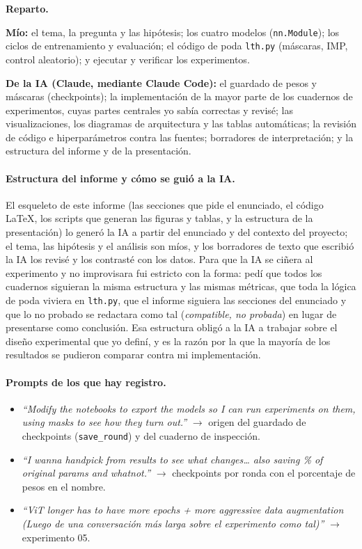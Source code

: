 \documentclass[11pt]{article}
\begin{document}
\textbf{Reparto.}

\textbf{Mío:} el tema, la pregunta y las hipótesis; los cuatro modelos (\texttt{nn.Module}); los ciclos de entrenamiento y evaluación; el código de poda \texttt{lth.py} (máscaras, IMP, control aleatorio); y ejecutar y verificar los experimentos. 

\textbf{De la IA (Claude, mediante Claude Code):} el guardado de pesos y máscaras (checkpoints); la implementación de la mayor parte de los cuadernos de experimentos, cuyas partes centrales yo sabía correctas y revisé; las visualizaciones, los diagramas de arquitectura y las tablas automáticas; la revisión de código e hiperparámetros contra las fuentes; borradores de interpretación; y la estructura del informe y de la presentación.

\paragraph{Estructura del informe y cómo se guió a la IA.} El esqueleto de este informe (las secciones que pide el enunciado, el código \LaTeX, los scripts que generan las figuras y tablas, y la estructura de la presentación) lo generó la IA a partir del enunciado y del contexto del proyecto; el tema, las hipótesis y el análisis son míos, y los borradores de texto que escribió la IA los revisé y los contrasté con los datos. Para que la IA se ciñera al experimento y no improvisara fui estricto con la forma: pedí que todos los cuadernos siguieran la misma estructura y las mismas métricas, que toda la lógica de poda viviera en \texttt{lth.py}, que el informe siguiera las secciones del enunciado y que lo no probado se redactara como tal (\textit{compatible, no probada}) en lugar de presentarse como conclusión. Esa estructura obligó a la IA a trabajar sobre el diseño experimental que yo definí, y es la razón por la que la mayoría de los resultados se pudieron comparar contra mi implementación.

\paragraph{Prompts de los que hay registro.}
\begin{itemize}[nosep]
    \item \textit{``Modify the notebooks to export the models so I can run experiments on them, using masks to see how they turn out.''} $\rightarrow$ origen del guardado de checkpoints (\texttt{save\_round}) y del cuaderno de inspección.
    \item \textit{``I wanna handpick from results to see what changes… also saving \% of original params and whatnot.''} $\rightarrow$ checkpoints por ronda con el porcentaje de pesos en el nombre.
    \item \textit{``ViT longer has to have more epochs + more aggressive data augmentation (Luego de una conversación más larga sobre el experimento como tal)''} $\rightarrow$ experimento 05.
\end{itemize}
\end{document}

